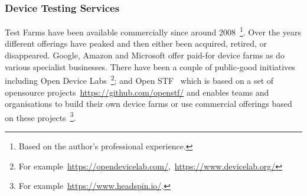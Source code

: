 \subsubsection{Device Testing Services}
Test Farms have been available commercially since around 2008~\footnote{Based on the author's professional experience.}. Over the years different offerings have peaked and then either been acquired, retired, or disappeared. Google, Amazon and Microsoft offer paid-for device farms as do various specialist businesses. There have been a couple of public-good initiatives including Open Device Labs~\footnote{For example~\url{https://opendevicelab.com/},~\url{https://www.devicelab.org/}}; and Open STF~\cite{openstf_website} which is based on a set of opensource projects~\url{https://github.com/openstf/} and enables teams and organisations to build their own device farms or use commercial offerings based on these projects~\footnote{For example~\url{https://www.headspin.io/}.}.
